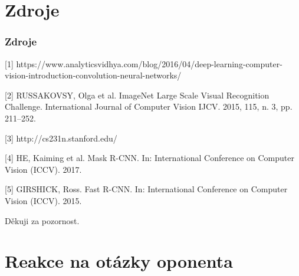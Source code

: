 \documentclass{beamer}
\begin{document}

\section{Zdroje}

\begin{frame}

\frametitle{Zdroje}

[1] https://www.analyticsvidhya.com/blog/2016/04/deep-learning-computer-vision-introduction-convolution-neural-networks/

[2] RUSSAKOVSY, Olga et al.
ImageNet Large Scale Visual Recognition
Challenge. International Journal of Computer Vision IJCV. 2015, 115, n. 3,
pp. 211–252.

[3] http://cs231n.stanford.edu/

[4] HE, Kaiming et al. Mask R-CNN. In: International Conference on Computer
Vision (ICCV). 2017.

[5] GIRSHICK, Ross. Fast R-CNN. In: International Conference on Computer
Vision (ICCV). 2015.

\end{frame}


\begin{frame}

\Huge{\centerline{Děkuji za pozornost.}}

\end{frame}


\section{Reakce na otázky oponenta}
\end{document}
